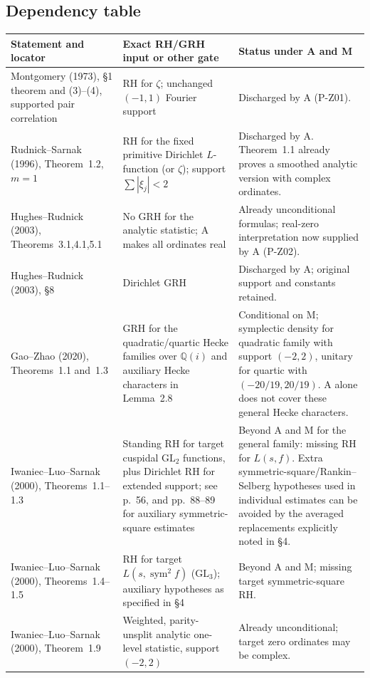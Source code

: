 \documentclass[11pt,a4paper]{article}
\theoremstyle{definition}\newtheorem{definition}{Definition}
\begin{document}
\subsection{Dependency table}
\begingroup\small
\begin{longtable}{p{}p{}p{}}
\hline
Statement and locator & Exact RH/GRH input or other gate & Status under A and M\\\hline
Montgomery (1973), \S1 theorem and (3)--(4), supported pair correlation & RH for $\zeta$; unchanged $(-1,1)$ Fourier support & Discharged by A (P-Z01).\\
Rudnick--Sarnak (1996), Theorem~1.2, $m=1$ & RH for the fixed primitive Dirichlet $L$-function (or $\zeta$); support $\sum|\xi_j|<2$ & Discharged by A. Theorem~1.1 already proves a smoothed analytic version with complex ordinates.\\
Hughes--Rudnick (2003), Theorems~3.1,4.1,5.1 & No GRH for the analytic statistic; A makes all ordinates real & Already unconditional formulas; real-zero interpretation now supplied by A (P-Z02).\\
Hughes--Rudnick (2003), \S8 & Dirichlet GRH & Discharged by A; original support and constants retained.\\
Gao--Zhao (2020), Theorems~1.1 and~1.3 & GRH for the quadratic/quartic Hecke families over $\mathbb Q(i)$ and auxiliary Hecke characters in Lemma~2.8 & Conditional on M; symplectic density for quadratic family with support $(-2,2)$, unitary for quartic with $(-20/19,20/19)$. A alone does not cover these general Hecke characters.\\
Iwaniec--Luo--Sarnak (2000), Theorems~1.1--1.3 & Standing RH for target cuspidal $\mathrm{GL}_2$ functions, plus Dirichlet RH for extended support; see p.~56, and pp.~88--89 for auxiliary symmetric-square estimates & Beyond A and M for the general family: missing RH for $L(s,f)$. Extra symmetric-square/Rankin--Selberg hypotheses used in individual estimates can be avoided by the averaged replacements explicitly noted in \S4.\\
Iwaniec--Luo--Sarnak (2000), Theorems~1.4--1.5 & RH for target $L(s,\operatorname{sym}^2f)$ ($\mathrm{GL}_3$); auxiliary hypotheses as specified in \S4 & Beyond A and M; missing target symmetric-square RH.\\
Iwaniec--Luo--Sarnak (2000), Theorem~1.9 & Weighted, parity-unsplit analytic one-level statistic, support $(-2,2)$ & Already unconditional; target zero ordinates may be complex.\\

\end{longtable}
\end{document}
